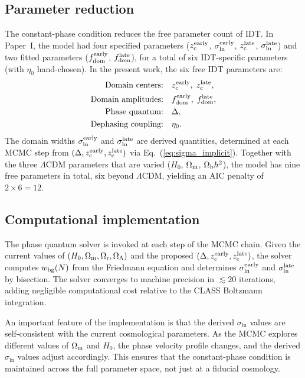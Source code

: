 \documentclass[aps,prd,twocolumn,superscriptaddress,nofootinbib]{revtex4-2}
\newcommand{\Om}{\Omega_{\rm m}}
\newcommand{\Ob}{\Omega_{\rm b}}
\newcommand{\Or}{\Omega_{\rm r}}
\newcommand{\OL}{\Omega_\Lambda}
\newcommand{\fdom}{f_{\rm dom}}
\newcommand{\zc}{z_{\rm c}}
\newcommand{\sln}{\sigma_{\ln}}
\newcommand{\Hubble}{H_0}
\newcommand{\etaz}{\eta_0}
\begin{document}
\subsection{Parameter reduction}
\label{sec:param_reduction}

The constant-phase condition reduces the free parameter count of IDT.
In Paper~I, the model had four specified parameters ($\zc^{\rm
early}$, $\sln^{\rm early}$, $\zc^{\rm late}$, $\sln^{\rm late}$) and
two fitted parameters ($\fdom^{\rm early}$, $\fdom^{\rm late}$), for a
total of six IDT-specific parameters (with $\etaz$ hand-chosen). In
the present work, the six free IDT parameters are:
\begin{align}
\text{Domain centers:}&\quad \zc^{\rm early},\; \zc^{\rm late},
\nonumber\\
\text{Domain amplitudes:}&\quad \fdom^{\rm early},\; \fdom^{\rm late},
\nonumber\\
\text{Phase quantum:}&\quad \Delta, \nonumber\\
\text{Dephasing coupling:}&\quad \etaz.
\label{eq:free_params}
\end{align}
The domain widths $\sln^{\rm early}$ and $\sln^{\rm late}$ are derived
quantities, determined at each MCMC step from $(\Delta, \zc^{\rm
early}, \zc^{\rm late})$ via Eq.~(\ref{eq:sigma_implicit}). Together
with the three $\Lambda$CDM parameters that are varied ($\Hubble$,
$\Om$, $\Ob h^2$), the model has nine free parameters in total, six
beyond $\Lambda$CDM, yielding an AIC penalty of $2 \times 6 = 12$.

\subsection{Computational implementation}
\label{sec:implementation}

The phase quantum solver is invoked at each step of the MCMC chain.
Given the current values of $(\Hubble, \Om, \Or, \OL)$ and the
proposed $(\Delta, \zc^{\rm early}, \zc^{\rm late})$, the solver
computes $w_{\rm bg}(N)$ from the Friedmann equation and determines
$\sln^{\rm early}$ and $\sln^{\rm late}$ by bisection. The solver
converges to machine precision in $\lesssim 20$ iterations, adding
negligible computational cost relative to the CLASS Boltzmann
integration.

An important feature of the implementation is that the derived
$\sln$ values are self-consistent with the current cosmological
parameters. As the MCMC explores different values of $\Om$ and
$\Hubble$, the phase velocity profile changes, and the derived
$\sln$ values adjust accordingly. This ensures that the constant-phase
condition is maintained across the full parameter space, not just at a
fiducial cosmology.
\end{document}
